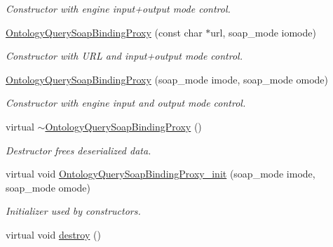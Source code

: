 \begin{DoxyCompactItemize}
\begin{DoxyCompactList}\small\item\em Constructor with engine input+output mode control. \end{DoxyCompactList}\item 
\hypertarget{classOntologyQuerySoapBindingProxy_afbe27157505698e0f049c6b908759440}{
\hyperlink{classOntologyQuerySoapBindingProxy_afbe27157505698e0f049c6b908759440}{OntologyQuerySoapBindingProxy} (const char $\ast$url, soap\_\-mode iomode)}
\label{classOntologyQuerySoapBindingProxy_afbe27157505698e0f049c6b908759440}

\begin{DoxyCompactList}\small\item\em Constructor with URL and input+output mode control. \end{DoxyCompactList}\item 
\hypertarget{classOntologyQuerySoapBindingProxy_a3f55cebb9dd5fffa215ee49713e71cea}{
\hyperlink{classOntologyQuerySoapBindingProxy_a3f55cebb9dd5fffa215ee49713e71cea}{OntologyQuerySoapBindingProxy} (soap\_\-mode imode, soap\_\-mode omode)}
\label{classOntologyQuerySoapBindingProxy_a3f55cebb9dd5fffa215ee49713e71cea}

\begin{DoxyCompactList}\small\item\em Constructor with engine input and output mode control. \end{DoxyCompactList}\item 
\hypertarget{classOntologyQuerySoapBindingProxy_a4fcf4583968f6223852e8ac700e6c657}{
virtual \hyperlink{classOntologyQuerySoapBindingProxy_a4fcf4583968f6223852e8ac700e6c657}{$\sim$OntologyQuerySoapBindingProxy} ()}
\label{classOntologyQuerySoapBindingProxy_a4fcf4583968f6223852e8ac700e6c657}

\begin{DoxyCompactList}\small\item\em Destructor frees deserialized data. \end{DoxyCompactList}\item 
\hypertarget{classOntologyQuerySoapBindingProxy_a0b547434088225364948736520e8628b}{
virtual void \hyperlink{classOntologyQuerySoapBindingProxy_a0b547434088225364948736520e8628b}{OntologyQuerySoapBindingProxy\_\-init} (soap\_\-mode imode, soap\_\-mode omode)}
\label{classOntologyQuerySoapBindingProxy_a0b547434088225364948736520e8628b}

\begin{DoxyCompactList}\small\item\em Initializer used by constructors. \end{DoxyCompactList}\item 
\hypertarget{classOntologyQuerySoapBindingProxy_a309392fd1ec8d5bf58de88336fd6350e}{
virtual void \hyperlink{classOntologyQuerySoapBindingProxy_a309392fd1ec8d5bf58de88336fd6350e}{destroy} ()}
\label{classOntologyQuerySoapBindingProxy_a309392fd1ec8d5bf58de88336fd6350e}


\end{DoxyCompactItemize}
